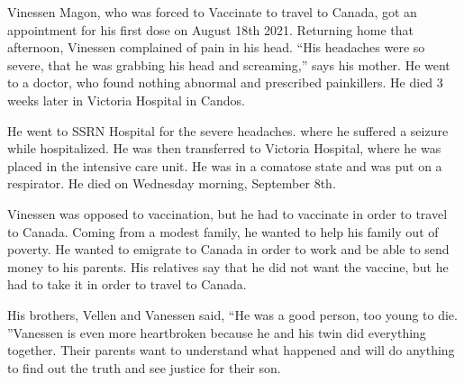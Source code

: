 Vinessen Magon, who was forced to Vaccinate to travel to Canada, got an
appointment for his first dose on August 18th 2021. Returning home that
afternoon, Vinessen complained of pain in his head. “His headaches were so
severe, that he was grabbing his head and screaming,” says his mother. He went
to a doctor, who found nothing abnormal and prescribed painkillers. He died 3
weeks later in Victoria Hospital in Candos.

He went to SSRN Hospital for the severe headaches. where he suffered a seizure
while hospitalized. He was then transferred to Victoria Hospital, where he was
placed in the intensive care unit. He was in a comatose state and was put on a
respirator. He died on Wednesday morning, September 8th.

Vinessen was opposed to vaccination, but he had to vaccinate in order to travel
to Canada. Coming from a modest family, he wanted to help his family out of
poverty. He wanted to emigrate to Canada in order to work and be able to send
money to his parents. His relatives say that he did not want the vaccine, but he
had to take it in order to travel to Canada.

His brothers, Vellen and Vanessen said, “He was a good person, too young to
die. ”Vanessen is even more heartbroken because he and his twin did everything
together. Their parents want to understand what happened and will do anything to
find out the truth and see justice for their son.

